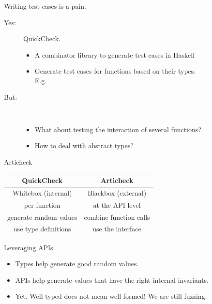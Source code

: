 \documentclass[10pt]{beamer}
\begin{document}
\begin{frame}{Writing test cases is a pain.}


  \begin{description}
  \item[\sc Yes:] QuickCheck.
    \begin{itemize}
    \item A combinator library to generate test cases in Haskell
    \item Generate test cases for \alert{functions} based on their \alert{types}.
      \\
      E.g. 
    \end{itemize}
  \item[\sc But:] ~\\
    \begin{itemize}
    \item What about testing the \alert{interaction} of several functions?
    \item How to deal with \alert{abstract} types?
    \end{itemize}
  \end{description}
\end{frame}

\begin{frame}{Articheck}


  \medskip

  \begin{center}
    \begin{tabular}{|c|c|}
      \hline
      QuickCheck & Articheck \\
      \hline
      Whitebox (internal) & Blackbox (external) \\
      per function & at the API level \\
      generate random values & combine function calls \\
      use type definitions & use the interface\\
      \hline
    \end{tabular}
  \end{center}
\end{frame}

\begin{frame}{Leveraging APIs}

  \begin{itemize}
  \item Types help generate \alert{good} random values.
    \pause
  \item APIs help generate values that have the right \alert{internal invariants}.
    \pause
  \item Yet. Well-typed does not mean well-formed! We are still \alert{fuzzing}.
  \end{itemize}

\end{frame}
\end{document}
